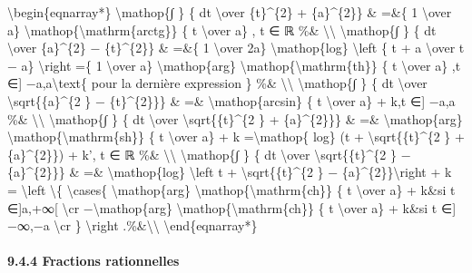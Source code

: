 \documentclass[]{article}
\begin{document}
\textbackslash{}begin\{eqnarray*\} \textbackslash{}mathop\{∫ \} \{ dt
\textbackslash{}over \{t\}\^{}\{2\} + \{a\}\^{}\{2\}\} \& =\&\{ 1
\textbackslash{}over a\}
\textbackslash{}mathop\{\textbackslash{}mathrm\{arctg\}\} \{ t
\textbackslash{}over a\} , t ∈ ℝ \%\& \textbackslash{}\textbackslash{}
\textbackslash{}mathop\{∫ \} \{ dt \textbackslash{}over \{a\}\^{}\{2\} −
\{t\}\^{}\{2\}\} \& =\&\{ 1 \textbackslash{}over 2a\}
\textbackslash{}mathop\{log\} \textbackslash{}left \textbar{}\{ t + a
\textbackslash{}over t − a\} \textbackslash{}right \textbar{} =\{ 1
\textbackslash{}over a\} \textbackslash{}mathop\{arg\}
\textbackslash{}mathop\{\textbackslash{}mathrm\{th\}\} \{ t
\textbackslash{}over a\} ,t ∈{]}
−\textbar{}a\textbar{},\textbar{}a\textbar{}{[}\textbackslash{}text\{
pour la dernière expression \} \%\& \textbackslash{}\textbackslash{}
\textbackslash{}mathop\{∫ \} \{ dt \textbackslash{}over
\textbackslash{}sqrt\{\{a\}\^{}\{2 \} − \{t\}\^{}\{2\}\}\} \& =\&
\textbackslash{}mathop\{arcsin\} \{ t \textbackslash{}over
\textbar{}a\textbar{}\} + k,t ∈{]}
−\textbar{}a\textbar{},\textbar{}a\textbar{}{[} \%\&
\textbackslash{}\textbackslash{} \textbackslash{}mathop\{∫ \} \{ dt
\textbackslash{}over \textbackslash{}sqrt\{\{t\}\^{}\{2 \} +
\{a\}\^{}\{2\}\}\} \& =\& \textbackslash{}mathop\{arg\}
\textbackslash{}mathop\{\textbackslash{}mathrm\{sh\}\} \{ t
\textbackslash{}over \textbar{}a\textbar{}\} + k
=\textbackslash{}mathop\{ log\} (t + \textbackslash{}sqrt\{\{t\}\^{}\{2
\} + \{a\}\^{}\{2\}\}) + k', t ∈ ℝ \%\& \textbackslash{}\textbackslash{}
\textbackslash{}mathop\{∫ \} \{ dt \textbackslash{}over
\textbackslash{}sqrt\{\{t\}\^{}\{2 \} − \{a\}\^{}\{2\}\}\} \& =\&
\textbackslash{}mathop\{log\} \textbackslash{}left \textbar{}t +
\textbackslash{}sqrt\{\{t\}\^{}\{2 \} −
\{a\}\^{}\{2\}\}\textbackslash{}right \textbar{} + k =
\textbackslash{}left \textbackslash{}\{ \textbackslash{}cases\{
\textbackslash{}mathop\{arg\}
\textbackslash{}mathop\{\textbackslash{}mathrm\{ch\}\} \{ t
\textbackslash{}over \textbar{}a\textbar{}\} + k\&si t
∈{]}\textbar{}a\textbar{},+∞{[} \textbackslash{}cr
−\textbackslash{}mathop\{arg\}
\textbackslash{}mathop\{\textbackslash{}mathrm\{ch\}\} \{
\textbar{}t\textbar{} \textbackslash{}over \textbar{}a\textbar{}\} +
k\&si t ∈{]} −∞,−\textbar{}a\textbar{}{[} \textbackslash{}cr \}
\textbackslash{}right .\%\&\textbackslash{}\textbackslash{}
\textbackslash{}end\{eqnarray*\}

\paragraph{9.4.4 Fractions rationnelles}
\end{document}
